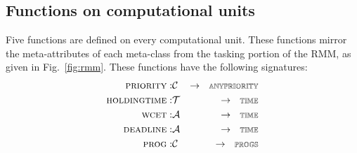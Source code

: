 
\subsection{Functions on computational units}
Five functions are defined on every computational unit. These
functions mirror the meta-attributes of each meta-class from the
tasking portion of the RMM, as given in Fig.~\ref{fig:rmm}. These
functions have the following signatures:
\begin{eqnarray}
  \label{eq:anypriority}
  \text{\scshape priority}: &{\cal C} & \to \ \ 
    {\scriptstyle \mathbb{ANYPRIORITY}} \\
  \text{\scshape holdingtime}: & {\cal T} & \to \ \  
    {\scriptstyle \mathbb{TIME}} \\
  \text{\scshape wcet}: & {\cal A}  &  \to \ \  
    {\scriptstyle \mathbb{TIME}} \\
  \text{\scshape deadline}: & {\cal A}   &  \to  \ \  
    {\scriptstyle \mathbb{TIME}} \\
  \text{\scshape prog}: & {\cal C}  & \to \ \  
    {\scriptstyle \mathbb{PROGS}} 
\end{eqnarray}

